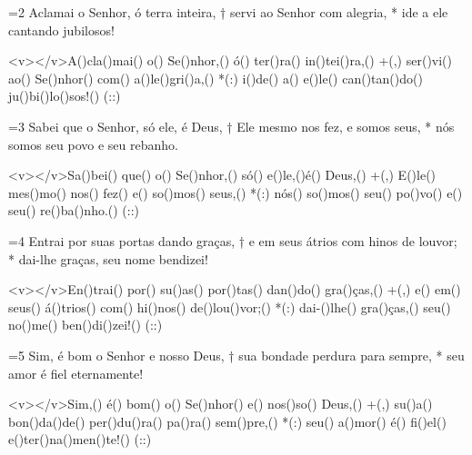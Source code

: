 =2 Aclamai o Senhor, ó terra inteira, †
servi ao Senhor com alegria, *
ide a ele cantando jubilosos!

<v></v>A()cla()mai() o() Se()nhor,() ó() ter()ra() in()tei()ra,() +(,)
ser()vi() ao() Se()nhor() com() a()le()gri()a,() *(:)
i()de() a() e()le() can()tan()do() ju()bi()lo()sos!() (::)

=3 Sabei que o Senhor, só ele, é Deus, †
Ele mesmo nos fez, e somos seus, *
nós somos seu povo e seu rebanho.

<v></v>Sa()bei() que() o() Se()nhor,() só() e()le,()é() Deus,() +(,)
E()le() mes()mo() nos() fez() e() so()mos() seus,() *(:)
nós() so()mos() seu() po()vo() e() seu() re()ba()nho.() (::)

=4 Entrai por suas portas dando graças, †
e em seus átrios com hinos de louvor; *
dai-lhe graças, seu nome bendizei!

<v></v>En()trai() por() su()as() por()tas() dan()do() gra()ças,() +(,)
e() em() seus() á()trios() com() hi()nos() de()lou()vor;() *(:)
dai-()lhe() gra()ças,() seu() no()me() ben()di()zei!() (::)

=5 Sim, é bom o Senhor e nosso Deus, †
sua bondade perdura para sempre, *
seu amor é fiel eternamente!

<v></v>Sim,() é() bom() o() Se()nhor() e() nos()so() Deus,() +(,)
su()a() bon()da()de() per()du()ra() pa()ra() sem()pre,() *(:)
seu() a()mor() é() fi()el() e()ter()na()men()te!() (::)